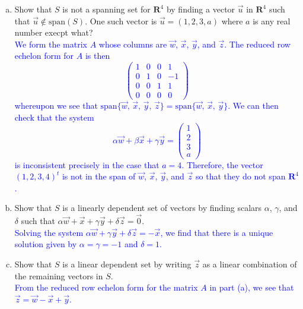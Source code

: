 \documentclass[a4paper,11pt]{article}
\newcommand{\R}{\mathbf{R}}
\newcommand{\BB}[1]{\textcolor{blue}{#1}}
\begin{document}
\begin{enumerate}[(a)]
\item Show that $S$ is not a spanning set for $\R^4$ by finding a vector $\vec
  u$ in $\R^4$ such that $\vec u \notin\text{span}(S)$. One such vector is $\vec
  u=(1,2,3,a)$ where $a$ is any real number execpt what? \\

  \BB{We form the matrix $A$ whose columns are $\vec w$, $\vec x$, $\vec y$, and
    $\vec z$. The reduced row echelon form for $A$ is then
    \[
      \left(
        \begin{array}{rrrr}
          1 & 0 & 0 & 1 \\
          0 & 1 & 0 & -1 \\
          0 & 0 & 1 & 1 \\
          0 & 0 & 0 & 0
        \end{array}
      \right)
    \]
    whereupon we see that $\text{span}\{\vec w,\,\vec x,\,\vec y,\,\vec
    z\}=\text{span}\{\vec w,\,\vec x,\,\vec y\}$. We can then check that the
    system
    \[
      \alpha\vec w+\beta\vec x+\gamma\vec y=
      \begin{pmatrix}
        1\\2\\3\\a
      \end{pmatrix}
    \]
    is inconsistent precisely in the case that $a=4$. Therefore, the vector
    $(1,2,3,4)^t$ is not in the span of $\vec w$, $\vec x$, $\vec y$, and
    $\vec z$ so that they do not span $\R^4$. \\}
  
\item Show that $S$ is a linearly dependent set of vectors by finding scalars
  $\alpha$, $\gamma$, and $\delta$ such that $\alpha\vec w+\vec x+\gamma\vec
  y+\delta\vec z=\vec 0$. \\

  \BB{Solving the system $\alpha\vec w+\gamma\vec y+\delta\vec z=-\vec x$, we
    find that there is a unique solution given by $\alpha=\gamma=-1$ and
    $\delta=1$. \\}
  
\item Show that $S$ is a linear dependent set by writing $\vec z$ as a linear
  combination of the remaining vectors in $S$. \\

  \BB{From the reduced row echelon form for the matrix $A$ in part (a), we see
    that $\vec z=\vec w-\vec x+\vec y$. \\}
\end{enumerate}
\end{document}
